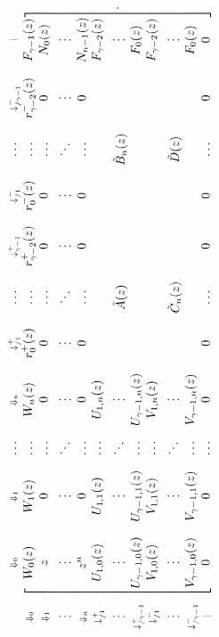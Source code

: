 \documentclass{article}
\begin{document}
\begin{equation*}
\rotatebox{90}{$
\begin{blockarray}{cccccccccccc}
   & \scriptstyle{\Downarrow_0} & \scriptstyle{\Downarrow_1} &
   \ldots & \scriptstyle{\Downarrow_n} &
    \scriptstyle{\downarrow_{/1}^+} & 
    \ldots & \scriptstyle{\downarrow_{\gamma-1}^+} &
    \scriptstyle{\downarrow_{/1}^-} & \ldots &
    \scriptstyle{\downarrow_{/\gamma-1}^-} & \scriptstyle{|} \\
\begin{block}{c[ccccccccccc]}
\scriptstyle{\Downarrow_0} & W_0(z) & W_1(z) & \ldots & W_n(z) &
    r_0^+(z) & \ldots & r_{\gamma-2}^+(z) & r_0^-(z) & \ldots &
    r_{\gamma-2}^-(z) & F_{\gamma-1}(z) \\
\scriptstyle{\Downarrow_1} & z  & 0 & \ldots &
  0 & 0 & \ldots & 0 & 0 & \ldots & 0 & N_0(z) \\
\vdots & \vdots & \vdots & \ddots & \vdots & \vdots & \ddots &
  \vdots & \vdots & \ddots & \vdots & \vdots \\
\scriptstyle{\Downarrow_n} & z^n & 0 & \ldots &
  0 & 0 & \ldots & 0 & 0 & \ldots & 0 & N_{n-1}(z) \\
\scriptstyle{\downarrow_{/1}^+} & U_{1,0}(z) & U_{1,1}(z) & \ldots &
  U_{1,n}(z) & & & & & & & F_{\gamma-2}(z) \\
\vdots & \vdots & \vdots & \ddots & \vdots & & \tilde{A}(z) & & &
  \tilde{B}_n(z) & & \vdots \\
\scriptstyle{\downarrow_{/\gamma-1}^+} & U_{\gamma-1,0}(z) &
  U_{\gamma-1,1}(z) & \ldots & U_{\gamma-1,n}(z) & & & & & & & F_0(z) \\
\scriptstyle{\downarrow_{/1}^-} & V_{1,0}(z) & V_{1,1}(z) & \ldots &
    V_{1,n}(z) & & & & & & & F_{\gamma-2}(z) \\
\vdots & \vdots & \vdots & \ddots & \vdots & & \tilde{C}_n(z) &
  & & \tilde{D}(z) & & \vdots \\
\scriptstyle{\downarrow_{/\gamma-1}^-} & V_{\gamma-1,0}(z) &
    V_{\gamma-1,1}(z) & \ldots & V_{\gamma-1,n}(z) & & &
    & & & & F_0(z) \\
\scriptstyle{|} & 0 & 0 & \ldots & 0 & 0 & \ldots & 0 & 0 &
  \ldots & 0 & 0 \\
\end{block}
\end{blockarray}.
$}
\end{equation*}

\pagebreak
\end{document}
